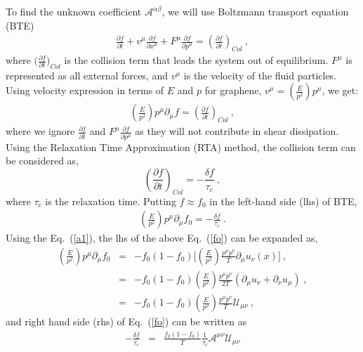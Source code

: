 \documentclass[amsmath,amssymb,aps,prb]{revtex4-2}
\newcommand{\be}{\begin{equation}}
\newcommand{\ee}{\end{equation}}
\newcommand{\bea}{\begin{eqnarray}}
\newcommand{\eea}{\end{eqnarray}}
\newcommand{\nn}{\nonumber}
\begin{document}
%
    To find the unknown coefficient $\mathcal{A}^{\alpha\beta}$, we will use Boltzmann transport equation (BTE)
    \bea
    \frac{\partial f}{\partial t}+v^\mu \frac{\partial f}{\partial x^\mu}+F^\mu \frac{\partial f}{\partial p^\mu}=\left( \frac{\partial f}{\partial t}\right)_{Col}~,
    \eea
    where $\Big( \frac{\partial f}{\partial t}\Big)_{Col}$ is the collision term that leads the system out of equilibrium. $F^\mu $ is represented as all external forces, and $v^\mu$ is the velocity of the fluid particles.
%
    Using velocity expression in terms of $E$ and $p$ for graphene, $v^\mu=(\frac{E}{p^2})p^\mu$, we get:
%
    \bea
    \left(\frac{E}{p^2}\right)p^\mu \partial_\mu f=\left( \frac{\partial f}{\partial t}\right)_{Col}~,
    \eea
    where we ignore $\frac{\partial f}{\partial t}$ and $F^\mu \frac{\partial f}{\partial p^\mu}$ as they will not contribute in shear dissipation. Using the Relaxation Time Approximation (RTA) method, the collision term can be considered as,
%
    \be
    \left( \frac{\partial f}{\partial t}\right)_{Col}=-\frac{\delta f}{\tau_c}~,
    \ee
%
    where $\tau_c$ is the relaxation time. Putting $f\approx f_0$ in the left-hand side (lhs) of BTE,
%
    \bea
    \left(\frac{E}{p^2}\right) p^\mu  \partial_\mu f_0=-\frac{\delta f}{\tau_c}~.
    \label{fo}
    \eea
%
    Using the Eq.~(\ref{a1}), the lhs of the above Eq.~(\ref{fo}) can be expanded as, 
%
    \bea
    \left( \frac{E}{p^2}\right) p^\mu \partial_\mu f_0 &=& -f_0(1-f_0) \Big[\left(\frac{E}{p^2}\right)\frac{p^\mu p^\nu}{T} \partial_\mu u_\nu (x) \Big]~,
    \nn\\
    &=&-f_0(1-f_0)  \left(\frac{E}{p^2}\right)\frac{p^\mu p^\nu}{2T} ( \partial_\mu u_\nu +\partial_\nu u_\mu)~,
    \nn\\
    &=&-f_0(1-f_0) \left(\frac{E}{p^2} \right)\frac{p^\mu p^\nu}{T} \mathcal{U}_{\mu \nu}~,
    \eea
%
%
    and right hand side (rhs) of Eq.~(\ref{fo}) can be written as
    \begin{eqnarray}
    -\frac{\delta f}{\tau_c}&=& \frac{ f_0(1-f_0)}{T} \frac{1}{\tau_c} \mathcal{A}^{\mu \nu} \mathcal{U}_{\mu \nu}
    \end{eqnarray}
\end{document}
